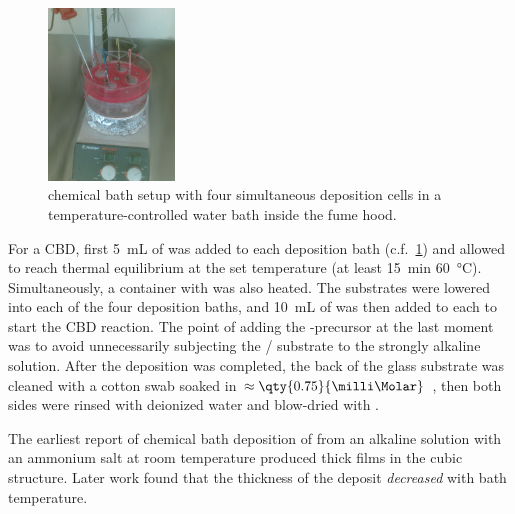 \documentclass[draft,webedition,openright,titles,swedish,english]{LuaUUThesis}\usepackage[]{graphicx}\usepackage[]{xcolor}
\newcommand{\cf}{c.f.}
\begin{document}
%

\begin{figure}
\centering
\includegraphics[width=0.30\textwidth]{synthesis/chemical-bath-deposition/CBD.jpg}
\caption[CdS CBD setup]{%
    chemical bath setup with four simultaneous deposition cells
   in a temperature-controlled water bath inside the fume hood.
}
\label{fig:0203-CBD-station}
\end{figure}


For a \gls{CBD}, first \qty{5}{\milli\L} of 
was added to each deposition bath (\cf\ \cref{fig:0203-CBD-station})
and allowed to reach thermal equilibrium at the set temperature
(at least \qty{15}{\minute} \qty{60}{\celsius}).
Simultaneously, a container with  was also heated.
The substrates were lowered into each of the four deposition baths, and
\qty{10}{\mL} of  was then added to each to start
the \gls{CBD} reaction.
The point of adding the -precursor at the last moment was to avoid unnecessarily
subjecting the / substrate to the strongly alkaline solution.
After the deposition was completed, the back of the glass substrate was
cleaned with a cotton swab soaked in $\approx\qty{0.75}{\milli\Molar}$ ,
then both sides were rinsed with deionized water and blow-dried with .

The earliest report \cite{Nagao1968} of chemical bath deposition of  from an alkaline
solution with an ammonium salt at room temperature produced thick films in the cubic structure.
Later work \cite{Nair1988,Mondal1983} found that the thickness of the deposit
\emph{decreased} with bath temperature.
\end{document}

